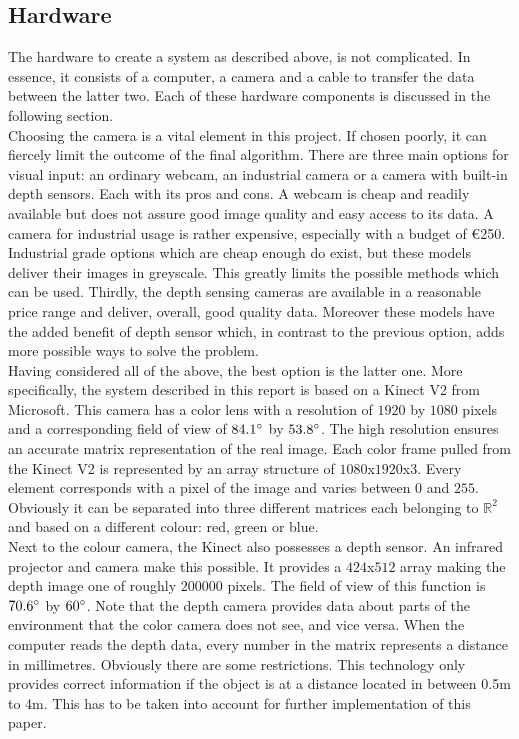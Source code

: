 \documentclass[11pt]{article}
\begin{document}
\subsection{Hardware}
The hardware to create a system as described above, is not complicated. In essence, it consists of a computer, a camera and a cable to transfer the data between the latter two. Each of these hardware components is discussed in the following section.\\
Choosing the camera is a vital element in this project. If chosen poorly, it can fiercely limit the outcome of the final algorithm. There are three main options for visual input: an ordinary webcam, an industrial camera or a camera with built-in depth sensors. Each with its pros and cons. A webcam is cheap and readily available but does not assure good image quality and easy access to its data. A camera for industrial usage is rather expensive, especially with a budget of \euro 250. Industrial grade options which are cheap enough do exist, but these models deliver their images in greyscale. This greatly limits the possible methods which can be used. Thirdly, the depth sensing cameras are available in a reasonable price range and deliver, overall, good quality data. Moreover these models have the added benefit of depth sensor which, in contrast to the previous option, adds more possible ways to solve the problem.\\
Having considered all of the above, the best option is the latter one. More specifically, the system described in this report is based on a Kinect V2 from Microsoft. This camera has a color lens with a resolution of $1920$ by $1080$ pixels and a corresponding field of view of $84.1\degree$ by $53.8\degree$\cite{kinect_specifications}. The high resolution ensures an accurate matrix representation of the real image. Each color frame pulled from the Kinect V2 is represented by an array structure of $1080$x$1920$x$3$. Every element corresponds with a pixel of the image and varies between $0$ and $255$. Obviously it can be separated into three different matrices each belonging to $\mathbb{R}^{2}$ and based on a different colour: red, green or blue.\\ Next to the colour camera, the Kinect also possesses a depth sensor. An infrared projector and camera make this possible\cite{kinect_v2}. It provides a $424$x$512$ array making the depth image one of roughly $200 000$ pixels. The field of view of this function is $70.6\degree$ by $60\degree$. Note that the depth camera provides data about parts of the environment that the color camera does not see, and vice versa. When the computer reads the depth data, every number in the matrix represents a distance in millimetres. Obviously there are some restrictions. This technology only provides correct information if the object is at a distance located in between 0.5m to 4m. This has to be taken into account for further implementation of this paper.\\
\end{document}
